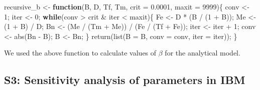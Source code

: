 \documentclass[
]{article}
\newenvironment{Shaded}{\begin{snugshade}}{\end{snugshade}}
\newcommand{\AttributeTok}[1]{\textcolor[rgb]{0.77,0.63,0.00}{#1}}
\newcommand{\ControlFlowTok}[1]{\textcolor[rgb]{0.13,0.29,0.53}{\textbf{#1}}}
\newcommand{\DecValTok}[1]{\textcolor[rgb]{0.00,0.00,0.81}{#1}}
\newcommand{\FloatTok}[1]{\textcolor[rgb]{0.00,0.00,0.81}{#1}}
\newcommand{\FunctionTok}[1]{\textcolor[rgb]{0.00,0.00,0.00}{#1}}
\newcommand{\NormalTok}[1]{#1}
\newcommand{\OtherTok}[1]{\textcolor[rgb]{0.56,0.35,0.01}{#1}}
\newcommand{\SpecialCharTok}[1]{\textcolor[rgb]{0.00,0.00,0.00}{#1}}
\begin{document}
\begin{Shaded}
\begin{Highlighting}[]
\NormalTok{recursive\_b }\OtherTok{\textless{}{-}} \ControlFlowTok{function}\NormalTok{(B, D, Tf, Tm, }\AttributeTok{crit =} \FloatTok{0.0001}\NormalTok{, }\AttributeTok{maxit =} \DecValTok{9999}\NormalTok{)\{}
\NormalTok{  conv }\OtherTok{\textless{}{-}} \DecValTok{1}\NormalTok{;}
\NormalTok{  iter }\OtherTok{\textless{}{-}} \DecValTok{0}\NormalTok{;}
  \ControlFlowTok{while}\NormalTok{(conv }\SpecialCharTok{\textgreater{}}\NormalTok{ crit }\SpecialCharTok{\&}\NormalTok{ iter }\SpecialCharTok{\textless{}}\NormalTok{ maxit)\{}
\NormalTok{    Fe   }\OtherTok{\textless{}{-}}\NormalTok{ D }\SpecialCharTok{*}\NormalTok{ (B }\SpecialCharTok{/}\NormalTok{ (}\DecValTok{1} \SpecialCharTok{+}\NormalTok{ B));}
\NormalTok{    Me   }\OtherTok{\textless{}{-}}\NormalTok{ (}\DecValTok{1} \SpecialCharTok{+}\NormalTok{ B) }\SpecialCharTok{/}\NormalTok{ D;}
\NormalTok{    Bn   }\OtherTok{\textless{}{-}}\NormalTok{ (Me }\SpecialCharTok{/}\NormalTok{ (Tm }\SpecialCharTok{+}\NormalTok{ Me)) }\SpecialCharTok{/}\NormalTok{ (Fe }\SpecialCharTok{/}\NormalTok{ (Tf }\SpecialCharTok{+}\NormalTok{ Fe));}
\NormalTok{    iter }\OtherTok{\textless{}{-}}\NormalTok{ iter }\SpecialCharTok{+} \DecValTok{1}\NormalTok{;}
\NormalTok{    conv }\OtherTok{\textless{}{-}} \FunctionTok{abs}\NormalTok{(Bn }\SpecialCharTok{{-}}\NormalTok{ B);}
\NormalTok{    B    }\OtherTok{\textless{}{-}}\NormalTok{ Bn;}
\NormalTok{  \}}
  \FunctionTok{return}\NormalTok{(}\FunctionTok{list}\NormalTok{(}\AttributeTok{B =}\NormalTok{ B, }\AttributeTok{conv =}\NormalTok{ conv, }\AttributeTok{iter =}\NormalTok{ iter));}
\NormalTok{\}}
\end{Highlighting}
\end{Shaded}

We used the above function to calculate values of \(\beta\) for the
analytical model.

\clearpage

\hypertarget{s3-sensitivity-analysis-of-parameters-in-ibm}{%
\subsection{S3: Sensitivity analysis of parameters in
IBM}\label{s3-sensitivity-analysis-of-parameters-in-ibm}}
\end{document}
